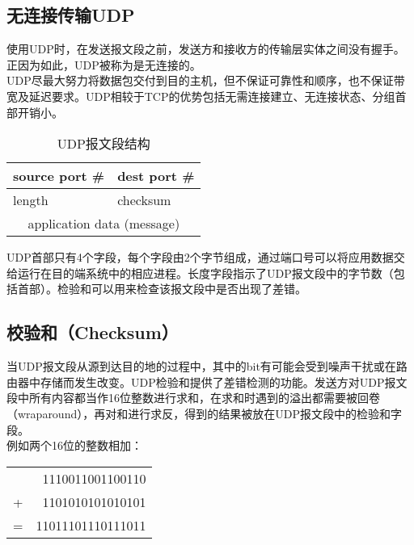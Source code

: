 \subsection{无连接传输UDP}

使用UDP时，在发送报文段之前，发送方和接收方的传输层实体之间没有握手。正因为如此，UDP被称为是无连接的。\\

UDP尽最大努力将数据包交付到目的主机，但不保证可靠性和顺序，也不保证带宽及延迟要求。UDP相较于TCP的优势包括无需连接建立、无连接状态、分组首部开销小。\\

\begin{table}[H]
	\centering
	\begin{tabular}{|p{3cm}<{\centering}|p{3cm}<{\centering}|}
		\hline
		source port \# & dest port \#                    \\
		\hline
		length         & checksum                        \\
		\hline
		\multicolumn{2}{|c|}{application data (message)} \\
		\hline
	\end{tabular}
	\caption{UDP报文段结构}
\end{table}

UDP首部只有4个字段，每个字段由2个字节组成，通过端口号可以将应用数据交给运行在目的端系统中的相应进程。长度字段指示了UDP报文段中的字节数（包括首部）。检验和可以用来检查该报文段中是否出现了差错。\\

\subsection{校验和（Checksum）}

当UDP报文段从源到达目的地的过程中，其中的bit有可能会受到噪声干扰或在路由器中存储而发生改变。UDP检验和提供了差错检测的功能。发送方对UDP报文段中所有内容都当作16位整数进行求和，在求和时遇到的溢出都需要被回卷（wraparound），再对和进行求反，得到的结果被放在UDP报文段中的检验和字段。\\

例如两个16位的整数相加：

\begin{table}[H]
	\centering
	\begin{tabular}{cD{.}{.}{3}}
		  & 1110011001100110  \\
		+ & 1101010101010101  \\
		\hline
		= & 11011101110111011
	\end{tabular}
\end{table}

